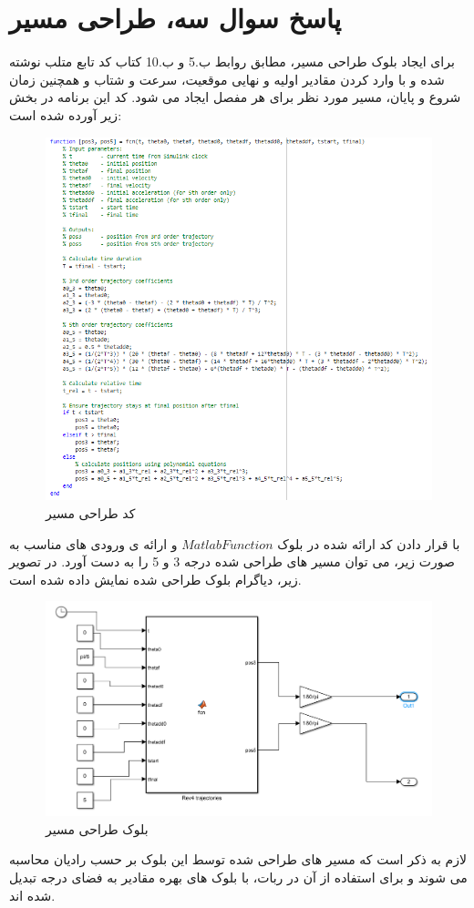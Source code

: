 \section*{ پاسخ سوال سه، طراحی مسیر}
برای ایجاد بلوک طراحی مسیر، مطابق روابط ب.5 و ب.10 کتاب کد تابع متلب نوشته شده و  با وارد کردن مقادیر اولیه و نهایی موقعیت، سرعت و شتاب و همچنین زمان شروع و پایان، مسیر مورد نظر برای هر مفصل ایجاد می شود. 
کد این برنامه در بخش زیر آورده شده است:
\begin{figure}[H]
	\centering
	\includegraphics[width=1\linewidth]{../img/11}
	\caption{کد طراحی مسیر}
	\label{fig:11}
\end{figure}
با قرار دادن کد ارائه شده در بلوک $Matlab Function$ و ارائه ی ورودی های مناسب به صورت زیر، می توان مسیر های طراحی شده درجه 3 و 5 را به دست آورد. در تصویر زیر، دیاگرام بلوک طراحی شده نمایش داده شده است.
\begin{figure}[H]
	\centering
	\includegraphics[width=0.7\linewidth]{../img/12}
	\caption{بلوک طراحی مسیر}
	\label{fig:12}
\end{figure}
لازم به ذکر است که مسیر های طراحی شده توسط این بلوک بر حسب رادیان محاسبه می شوند و برای استفاده از آن در ربات، با بلوک های بهره مقادیر به فضای درجه تبدیل شده اند. 

